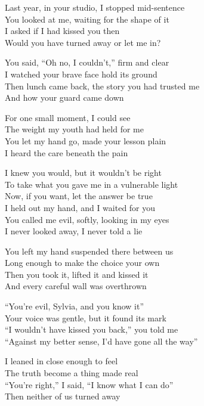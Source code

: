 \begin{lyrics}
Last year, in your studio, I stopped mid-sentence\\
You looked at me, waiting for the shape of it\\
I asked if I had kissed you then\\
Would you have turned away or let me in?

You said, “Oh no, I couldn’t,” firm and clear\\
I watched your brave face hold its ground\\
Then lunch came back, the story you had trusted me\\
And how your guard came down

For one small moment, I could see\\
The weight my youth had held for me\\
You let my hand go, made your lesson plain\\
I heard the care beneath the pain

I knew you would, but it wouldn’t be right\\
To take what you gave me in a vulnerable light\\
Now, if you want, let the answer be true\\
I held out my hand, and I waited for you\\
You called me evil, softly, looking in my eyes\\
I never looked away, I never told a lie

You left my hand suspended there between us\\
Long enough to make the choice your own\\
Then you took it, lifted it and kissed it\\
And every careful wall was overthrown

“You’re evil, Sylvia, and you know it”\\
Your voice was gentle, but it found its mark\\
“I wouldn’t have kissed you back,” you told me\\
“Against my better sense, I’d have gone all the way”

I leaned in close enough to feel\\
The truth become a thing made real\\
“You’re right,” I said, “I know what I can do”\\
Then neither of us turned away


\end{lyrics}
